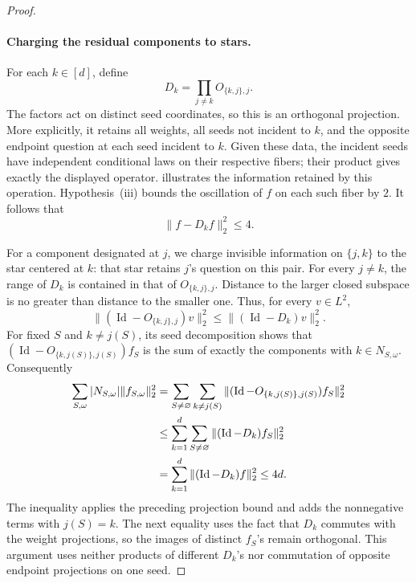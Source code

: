 \begin{proof}
\paragraph{Charging the residual components to stars.}
For each \(k\in[d]\), define
\[
 D_k=\prod_{j\ne k}O_{\{k,j\},j}.
\]
The factors act on distinct seed coordinates, so this is an orthogonal
projection.  More explicitly, it retains all weights, all seeds not
incident to \(k\), and the opposite endpoint question at each seed
incident to \(k\).  Given these data, the incident seeds have independent
conditional laws on their respective fibers; their product gives exactly
the displayed operator.   illustrates the information retained by this operation.
Hypothesis~\textup{(iii)} bounds the oscillation
of \(f\) on each such fiber by \(2\).  It follows that
\begin{equation}\label{res:star-energy}
 \|f-D_kf\|_2^2\leq4.
\end{equation}


For a component designated at \(j\), we charge invisible information
on \(\{j,k\}\) to the star centered at \(k\): that star retains
\(j\)'s question on this pair. For every \(j\ne k\), the range
of \(D_k\) is contained in that of
\(O_{\{k,j\},j}\).  Distance to the larger closed subspace is no
greater than distance to the smaller one.  Thus, for every \(v\in L^2\),
\[
 \|(\operatorname{Id}-O_{\{k,j\},j})v\|_2^2
       \leq\|(\operatorname{Id}-D_k)v\|_2^2.
\]
For fixed \(S\) and \(k\ne j(S)\), its seed decomposition shows that
\((\operatorname{Id}-O_{\{k,j(S)\},j(S)})f_S\) is the sum of exactly
the components with \(k\in N_{S,\omega}\).  Consequently
\begin{align}
 \sum_{S,\omega}|N_{S,\omega}|\|f_{S,\omega}\|_2^2
  &=\sum_{S\ne\varnothing}\sum_{k\ne j(S)}
    \|(\operatorname{Id}-O_{\{k,j(S)\},j(S)})f_S\|_2^2
       \notag\\
  &\leq\sum_{k=1}^d\sum_{S\ne\varnothing}
       \|(\operatorname{Id}-D_k)f_S\|_2^2
       \notag\\
  &=\sum_{k=1}^d\|(\operatorname{Id}-D_k)f\|_2^2
    \leq4d.\label{res:residual-degree}
\end{align}
The inequality applies the preceding projection bound and adds the
nonnegative terms with \(j(S)=k\). The next
equality uses the fact that \(D_k\) commutes with the weight projections,
so the images of distinct \(f_S\)'s remain orthogonal.  This argument
uses neither products of different \(D_k\)'s nor commutation of
opposite endpoint projections on one seed.


\end{proof}
